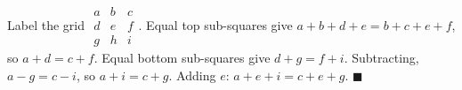Label the grid $\begin{smallmatrix}a&b&c\\d&e&f\\g&h&i\end{smallmatrix}$. Equal top sub-squares give $a+b+d+e=b+c+e+f$, so $a+d=c+f$. Equal bottom sub-squares give $d+g=f+i$. Subtracting, $a-g=c-i$, so $a+i=c+g$. Adding $e$: $a+e+i=c+e+g$. $\blacksquare$

